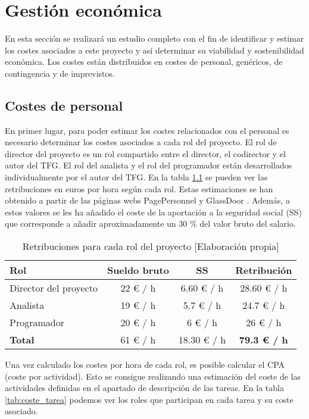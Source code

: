 \chapter{Gestión económica}
En esta sección se realizará un estudio completo con el fin de identificar y estimar los costes asociados a este proyecto y así determinar su viabilidad y sostenibilidad económica. Los costes están distribuidos en costes de personal, genéricos, de contingencia y de imprevistos.

\section{Costes de personal}
En primer lugar, para poder estimar los costes relacionados con el personal es necesario determinar los costes asociados a cada rol del proyecto. El rol de director del proyecto es un rol compartido entre el director, el codirector y el autor del TFG. El rol del analista y el rol del programador están desarrollados individualmente por el autor del TFG. En la tabla \ref{tab:remuneracion} se pueden ver las retribuciones en euros por hora según cada rol. Estas estimaciones se han obtenido a partir de las páginas webs PagePersonnel \cite{pagePersonel} y GlassDoor \cite{glassdoor}. Además, a estos valores se les ha añadido el coste de la aportación a la seguridad social (SS) que corresponde a añadir aproximadamente un 30 \% del valor bruto del salario.  

\begin{table}[h]
    \begin{center}
        \begin{tabular}{ l  c  c  c }
        \textbf{Rol} & \textbf{Sueldo bruto} & \textbf{SS} & \textbf{Retribución} \\ \hline
        Director del proyecto & 22 € / h & 6.60 € / h & 28.60 € / h \\ 
        Analista & 19 € / h & 5.7 € / h & 24.7 € / h \\
        Programador & 20 € / h & 6 € / h & 26 € / h \\
        \hline
         \textbf{Total} & 61 € / h & 18.30 € / h & \textbf{79.3 € / h}  \\
        \end{tabular}
        \caption{Retribuciones para cada rol del proyecto [Elaboración propia]}
        \label{tab:remuneracion}
    \end{center}
\end{table}
Una vez calculado los costes por hora de cada rol, es posible calcular el CPA (coste por actividad). Esto se consigue realizando una estimación del coste de las actividades definidas en el apartado de descripción de las tareas. En la tabla \ref{tab:coste_tarea} podemos ver los roles que participan en cada tarea y su coste asociado.


